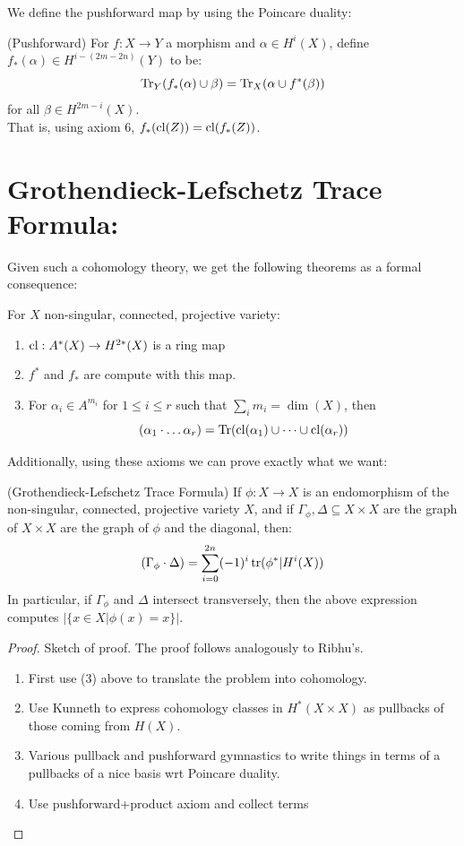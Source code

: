 \documentclass[12pt]{amsart}
\begin{document}
\newpage
We define the pushforward map by using the Poincare duality: 
\begin{definition}(Pushforward)
    For $f: X \to Y$ a morphism and $\alpha \in H^i(X)$, define $f_*(\alpha) \in H^{i-(2m-2n)}(Y)$ to be: 
    \[ \operatorname{Tr}_Y(f_*(\alpha)\cup \beta) = \operatorname{Tr}_X(\alpha \cup f^*(\beta))\]
    for all $\beta \in H^{2m-i}(X)$. \\
    That is, using axiom 6, $f_*(\operatorname{cl}(Z)) = \operatorname{cl}(f_*(Z))$.
\end{definition}

\newpage

\section{Grothendieck-Lefschetz Trace Formula:}

Given such a cohomology theory, we get the following theorems as a formal consequence: 
\begin{theorem}
    For $X$ non-singular, connected, projective variety:
    \begin{enumerate}
        \item $\operatorname{cl}: A^*(X)\to H^{2*}(X)$ is a ring map
        \item $f^*$ and $f_*$ are compute with this map. 
        \item For $\alpha_i \in A^{m_i}$ for $1 \leq i \leq r$ such that $\sum_i m_i = \dim(X)$, then 
        \[ (\alpha_1 \cdot \ldots \alpha_r) = \operatorname{Tr}(\operatorname{cl}(\alpha_1) \cup \cdots \cup \operatorname{cl}(\alpha_r))\]        
    \end{enumerate}
\end{theorem}

Additionally, using these axioms we can prove exactly what we want:
\begin{theorem}(Grothendieck-Lefschetz Trace Formula) If $\phi: X \to X$ is an endomorphism of the non-singular, connected, projective variety $X$, and if $\Gamma_\phi, \Delta \subseteq X \times X$ are the graph of $X \times X$ are the graph of $\phi$ and the diagonal, then:  
    \[ (\Gamma_\phi \cdot \Delta) = \sum_{i = 0}^{2n} (-1)^i \operatorname{tr}(\phi^*|H^i(X))\]
In particular, if $\Gamma_\phi$ and $\Delta$ intersect transversely, then the above expression computes $|\{x \in X | \phi(x) = x\}|$. 
\end{theorem}

\begin{proof}{Sketch of proof.}
    The proof follows analogously to Ribhu's. 
    \begin{enumerate}
        \item First use (3) above to translate the problem into cohomology.
        \item Use Kunneth to express cohomology classes in $H^*(X \times X)$ as pullbacks of those coming from $H(X)$.
        \item Various pullback and pushforward gymnastics to write things in terms of a pullbacks of a nice basis wrt Poincare duality.
        \item Use pushforward+product axiom and collect terms
    \end{enumerate}
\end{proof}
\end{document}
